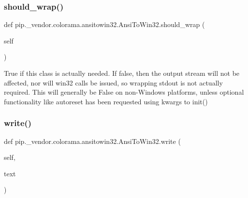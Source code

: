\mbox{\label{classpip_1_1__vendor_1_1colorama_1_1ansitowin32_1_1AnsiToWin32_a3414c7ec2cb2605822986d95cb1d1831}} 
\subsubsection{\texorpdfstring{should\+\_\+wrap()}{should\_wrap()}}
{\footnotesize\ttfamily def pip.\+\_\+vendor.\+colorama.\+ansitowin32.\+Ansi\+To\+Win32.\+should\+\_\+wrap (\begin{DoxyParamCaption}\item[{}]{self }\end{DoxyParamCaption})}

\begin{DoxyVerb}True if this class is actually needed. If false, then the output
stream will not be affected, nor will win32 calls be issued, so
wrapping stdout is not actually required. This will generally be
False on non-Windows platforms, unless optional functionality like
autoreset has been requested using kwargs to init()
\end{DoxyVerb}
 \mbox{\label{classpip_1_1__vendor_1_1colorama_1_1ansitowin32_1_1AnsiToWin32_aa62e555eeb1742f0060b85b18cf85dd9}} 
\subsubsection{\texorpdfstring{write()}{write()}}
{\footnotesize\ttfamily def pip.\+\_\+vendor.\+colorama.\+ansitowin32.\+Ansi\+To\+Win32.\+write (\begin{DoxyParamCaption}\item[{}]{self,  }\item[{}]{text }\end{DoxyParamCaption})}

